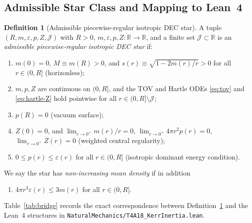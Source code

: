 \documentclass[11pt]{article}
\theoremstyle{plain}
\theoremstyle{definition}
\newtheorem{definition}[theorem]{Definition}
\newcommand{\R}{\mathbb{R}}
\newcommand{\eps}{\varepsilon}
\begin{document}
\subsection{Admissible Star Class and Mapping to Lean~4}

\begin{definition}[Admissible piecewise-regular isotropic DEC star]
\label{def:star}
A tuple $(R, m, \eps, p, Z, \mathcal{J})$ with $R > 0$, $m, \eps, p, Z : \R \to \R$, and a finite set $\mathcal{J} \subset \R$ is an \emph{admissible piecewise-regular isotropic DEC star} if:
\begin{enumerate}
  \item[\textbf{(H1)}] $m(0) = 0$, $M \equiv m(R) > 0$, and $s(r) \equiv \sqrt{1 - 2 m(r)/r} > 0$ for all $r \in (0, R]$ (horizonless);
  \item[\textbf{(H2)}] $m, p, Z$ are continuous on $(0, R]$, and the TOV and Hartle ODEs \eqref{eq:tov} and \eqref{eq:hartle-Z} hold pointwise for all $r \in (0, R] \setminus \mathcal{J}$;
  \item[\textbf{(H3)}] $p(R) = 0$ (vacuum surface);
  \item[\textbf{(H4)}] $Z(0) = 0$, and $\lim_{r\to 0^+} m(r)/r = 0$, $\lim_{r\to 0^+} 4\pi r^2 p(r) = 0$, $\lim_{r\to 0^+} Z(r) = 0$ (weighted central regularity);
  \item[\textbf{(H5)}] $0 \le p(r) \le \eps(r)$ for all $r \in (0, R]$ (isotropic dominant energy condition).
\end{enumerate}
We say the star has \emph{non-increasing mean density} if in addition
\begin{enumerate}
  \item[\textbf{(H6)}] $4\pi r^3 \eps(r) \le 3 m(r)$ for all $r \in (0, R]$.
\end{enumerate}
\end{definition}

Table~\ref{tab:bridge} records the exact correspondence between Definition~\ref{def:star} and the Lean~4 structures in \texttt{NaturalMechanics/T4A18\_KerrInertia.lean}.
\end{document}
